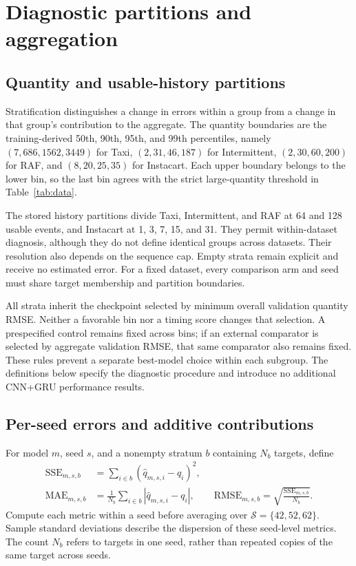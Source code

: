 \documentclass[runningheads]{llncs}
\begin{document}
\section{Diagnostic partitions and aggregation}
\label{app:strata}
\subsection{Quantity and usable-history partitions}
Stratification distinguishes a change in errors within a group from a change
in that group's contribution to the aggregate. The quantity boundaries are
the training-derived 50th, 90th, 95th, and 99th percentiles, namely
$(7,686,1562,3449)$ for Taxi, $(2,31,46,187)$ for Intermittent,
$(2,30,60,200)$ for RAF, and $(8,20,25,35)$ for Instacart.
Each upper boundary belongs to the lower bin, so the last bin agrees with
the strict large-quantity threshold in Table~\ref{tab:data}.

The stored history partitions divide Taxi, Intermittent, and RAF at 64 and
128 usable events, and Instacart at 1, 3, 7, 15, and 31. They permit
within-dataset diagnosis, although they do not define identical groups
across datasets. Their resolution also depends on the sequence cap.
Empty strata remain explicit and receive no estimated error. For a fixed
dataset, every comparison arm and seed must share target membership and
partition boundaries.

All strata inherit the checkpoint selected by minimum overall validation
quantity RMSE. Neither a favorable bin nor a timing score changes that
selection. A prespecified control remains fixed across bins; if an external
comparator is selected by aggregate validation RMSE, that same comparator
also remains fixed. These rules prevent a separate best-model choice within
each subgroup. The definitions below specify the diagnostic procedure and
introduce no additional CNN+GRU performance results.

\subsection{Per-seed errors and additive contributions}
For model $m$, seed $s$, and a nonempty stratum $b$ containing $N_b$
targets, define
\begin{align}
 \mathrm{SSE}_{m,s,b}&=\sum_{i\in b}(\widehat q_{m,s,i}-q_i)^2,\\
 \mathrm{MAE}_{m,s,b}&=\frac{1}{N_b}\sum_{i\in b}
       |\widehat q_{m,s,i}-q_i|,\qquad
 \mathrm{RMSE}_{m,s,b}=\sqrt{\frac{\mathrm{SSE}_{m,s,b}}{N_b}}.
 \label{eq:stratum-errors}
\end{align}
Compute each metric within a seed before averaging over
$\mathcal S=\{42,52,62\}$. Sample standard deviations describe the dispersion
of these seed-level metrics. The count $N_b$ refers to targets in one seed,
rather than repeated copies of the same target across seeds.
\end{document}
